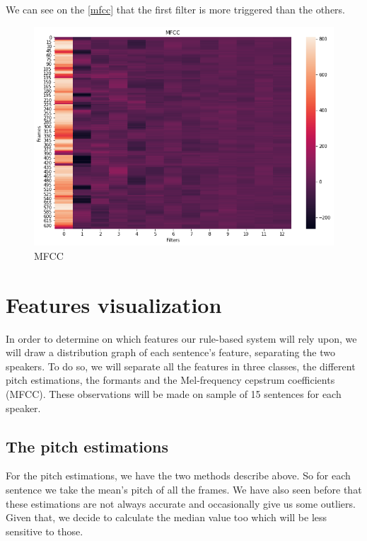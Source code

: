 \documentclass[]{article}
\begin{document}
We can see on the \autoref{mfcc} that the first filter is more triggered than the others.

\begin{figure}[H]
    \centering
    \caption{\label{mfcc}MFCC}
    \includegraphics[scale=0.5]{images/mfcc.png}
\end{figure}
\section{Features visualization}

In order to determine on which features our rule-based system will rely upon, we will draw a
distribution graph of each sentence's feature, separating the two speakers. To do so, we will separate all
the features in three classes, the different pitch estimations, the formants and
the Mel-frequency cepstrum coefficients (MFCC). These observations will be made on sample of
15 sentences for each speaker.

\subsection{The pitch estimations}

For the pitch estimations, we have the two methods describe above. So for each sentence 
we take the mean's pitch of all the frames. We have also seen before that these estimations are
not always accurate and occasionally give us some outliers. Given that, we decide to calculate
the median value too which will be less sensitive to those.
\end{document}
